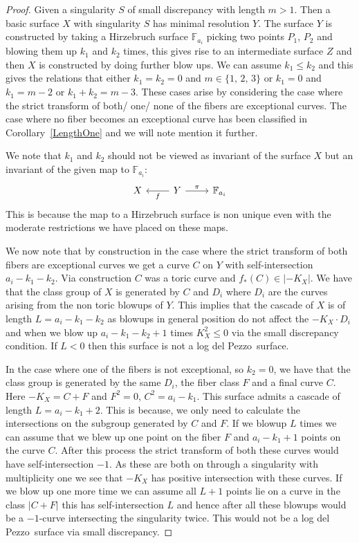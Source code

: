 \documentclass[12pt,a4paper]{book}      %
\theoremstyle{definition}
\newcommand{\ldp}{log del Pezzo}
\newcommand{\mb}[1]{\mathbb{#1}}
\begin{document}
\begin{proof}
Given a singularity $S$ of small discrepancy with length $m>1$. Then a basic surface $X$ with singularity $S$ has minimal resolution $Y$. The surface $Y$ is constructed by taking a Hirzebruch surface $\mb{F}_{a_i}$ picking two points $P_1$, $P_2$ and blowing them up $k_1$ and $k_2$ times, this gives rise to an intermediate surface $Z$ and then $X$ is constructed by doing further blow ups. We can assume $k_1 \leq k_2$ and this gives the relations that either $k_1 = k_2 = 0$ and $m \in \{1, \, 2, \, 3 \}$ or $k_1 = 0$ and $k_1 = m-2$ or $k_1 + k_2 = m-3$. These cases arise by considering the case where the strict transform of both/ one/ none of the fibers are exceptional curves. The case where no fiber becomes an exceptional curve has been classified in Corollary~\ref{LengthOne} and we will note mention it further.


We note that $k_1$ and $k_2$ should not be viewed as invariant of the surface $X$ but an invariant of the given map to $\mb{F}_{a_i}$:
\[
\begin{tikzcd}
X & Y \arrow[l, "f"] \arrow[r, "\pi"] & \mb{F}_{a_i}
\end{tikzcd}
\]
This is because the map to a Hirzebruch surface is non unique even with the moderate restrictions we have placed on these maps.


We now note that by construction in the case where the strict transform of both fibers are exceptional curves we get a curve $C$ on $Y$ with self-intersection $a_i - k_1 -k_2$. Via construction $C$ was a toric curve and $f_*(C) \in |-K_X|$. We have that the class group of $X$ is generated by $C$ and $D_i$ where $D_i$ are the curves arising from the non toric blowups of $Y$. This implies that the cascade of $X$ is of length $L = a_i - k_1-k_2$  as blowups in general position do not affect the $-K_X \cdot D_i$ and when we blow up $a_i - k_1 -k_2 +1$ times $K_X^2 \leq 0$ via the small discrepancy condition. If $L < 0$ then this surface is not a \ldp\ surface.


In the case where one of the fibers is not exceptional, so $k_2  = 0$,  we have that the class group is generated by the same $D_i$, the fiber class $F$ and a final curve $C$. Here $-K_X = C + F$ and $F^2 = 0$, $C^2 =  a_i - k_1$. This surface admits a cascade of length $L = a_i - k_1 + 2$. This is because, we only need to calculate the intersections on the subgroup generated by $C$ and $F$. If we blowup $L$ times we can assume that we blew up one point on the fiber $F$ and $a_i-k_1+1$ points on the curve $C$. After this process the strict transform of both these curves would have self-intersection $-1$. As these are both on through a singularity with multiplicity one we see that $-K_X$ has positive intersection with these curves. If we blow up one more time we can assume all $L+1$ points lie on a curve in the class $|C+F|$ this has self-intersection $L$ and hence after all these blowups would be a $-1$-curve intersecting the singularity twice. This would not be a \ldp\ surface via small discrepancy.



\end{proof}
\end{document}
